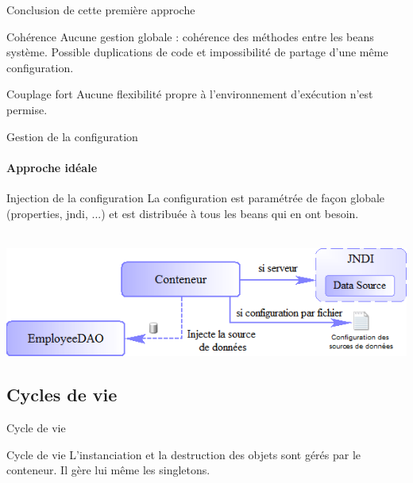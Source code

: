 \documentclass[compress]{beamer}%
\begin{document}
\begin{frame}{Conclusion de cette première approche}
	
	\begin{alertblock}{Cohérence}
	Aucune gestion globale : cohérence des méthodes entre les beans système. Possible duplications de code et impossibilité de partage d'une même configuration.%
	\end{alertblock}
	
	\pause
	\begin{alertblock}{Couplage fort}
	Aucune flexibilité propre à l'environnement d'exécution n'est permise.
	\end{alertblock}
\end{frame}

\begin{frame}{Gestion de la configuration}
	\framesubtitle{Approche idéale}
	
	\begin{block}{Injection de la configuration}
	La configuration est paramétrée de façon globale (properties, jndi, ...) et est distribuée à tous les beans qui en ont besoin.
	\end{block}
	~\\
	
	\pause	
	\includegraphics[width=\textwidth]{images/spring_datasource_with.png}
\end{frame}


\subsection{Cycles de vie}

\begin{frame}{Cycle de vie}

	\begin{block}{Cycle de vie}
	L'instanciation et la destruction des objets sont gérés par le conteneur. Il gère lui même les singletons.
	\end{block}

\end{frame}
\end{document}
